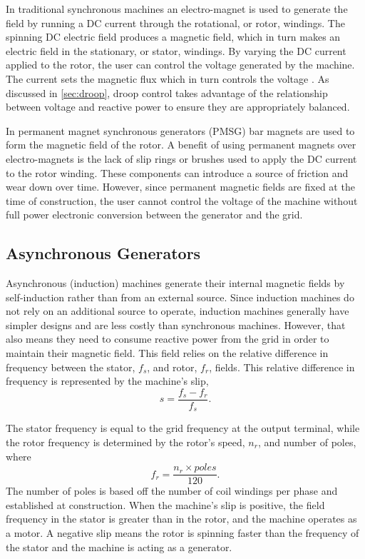 In traditional synchronous machines an electro-magnet is used to generate the field by running a DC current through the rotational, or rotor, windings. The spinning DC electric field produces a magnetic field, which in turn makes an electric field in the stationary, or stator, windings. By varying the DC current applied to the rotor, the user can control the voltage generated by the machine. The current sets the magnetic flux which in turn controls the voltage \cite{Chapman2005}. As discussed in \autoref{sec:droop}, droop control takes advantage of the relationship between voltage and reactive power to ensure they are appropriately balanced.

In permanent magnet synchronous generators (PMSG) bar magnets are used to form the magnetic field of the rotor. A benefit of using permanent magnets over electro-magnets is the lack of slip rings or brushes used to apply the DC current to the rotor winding. These components can introduce a source of friction and wear down over time. However, since permanent magnetic fields are fixed at the time of construction, the user cannot control the voltage of the machine without full power electronic conversion between the generator and the grid.

\subsection{Asynchronous Generators}
Asynchronous (induction) machines generate their internal magnetic fields by self-induction rather than from an external source. Since induction machines do not rely on an additional source to operate, induction machines generally have simpler designs and are less costly than synchronous machines. However, that also means they need to consume reactive power from the grid in order to maintain their magnetic field. This field relies on the relative difference in frequency between the stator, $f_{s}$, and rotor, $f_{r}$, fields. This relative difference in frequency is represented by the machine's slip, %
\cite{Chapman2005}
\begin{equation}
	s = \frac{f_{s} - f_{r}}{f_{s}}.
\end{equation}

The stator frequency is equal to the grid frequency at the output terminal, while the rotor frequency is determined by the rotor's speed, $n_r$, and number of poles, where 
\begin{equation}
	f_r = \frac{n_r \times poles}{120}.
\end{equation}
The number of poles is based off the number of coil windings per phase and established at construction. When the machine's slip is positive, the field frequency in the stator is greater than in the rotor, and the machine operates as a motor. A negative slip means the rotor is spinning faster than the frequency of the stator and the machine is acting as a generator. 

